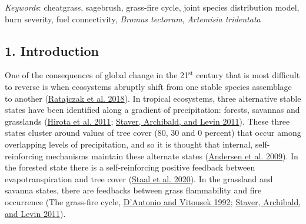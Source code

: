\documentclass[
  12pt,
]{article}
\begin{document}
\emph{Keywords}: cheatgrass, sagebrush, grass-fire cycle, joint species
distribution model, burn severity, fuel connectivity, \emph{Bromus
tectorum}, \emph{Artemisia tridentata}

\hypertarget{introduction}{%
\subsection{1. Introduction}\label{introduction}}

One of the consequences of global change in the 21\(^\text{st}\) century
that is most difficult to reverse is when ecosystems abruptly shift from
one stable species assemblage to another
(\protect\hyperlink{ref-Ratajczak2018}{Ratajczak et al. 2018}). In
tropical ecosystems, three alternative stable states have been
identified along a gradient of precipitation: forests, savannas and
grasslands (\protect\hyperlink{ref-Hirota2011}{Hirota et al. 2011};
\protect\hyperlink{ref-Staver2011}{Staver, Archibald, and Levin 2011}).
These three states cluster around values of tree cover (80, 30 and 0
percent) that occur among overlapping levels of precipitation, and so it
is thought that internal, self-reinforcing mechanisms maintain these
alternate states (\protect\hyperlink{ref-Andersen2009}{Andersen et al.
2009}). In the forested state there is a self-reinforcing positive
feedback between evapotranspiration and tree cover
(\protect\hyperlink{ref-Staal2020}{Staal et al. 2020}). In the grassland
and savanna states, there are feedbacks between grass flammability and
fire occurrence (The grass-fire cycle,
\protect\hyperlink{ref-DAntonio1992}{D'Antonio and Vitousek 1992};
\protect\hyperlink{ref-Staver2011}{Staver, Archibald, and Levin 2011}).
\end{document}
